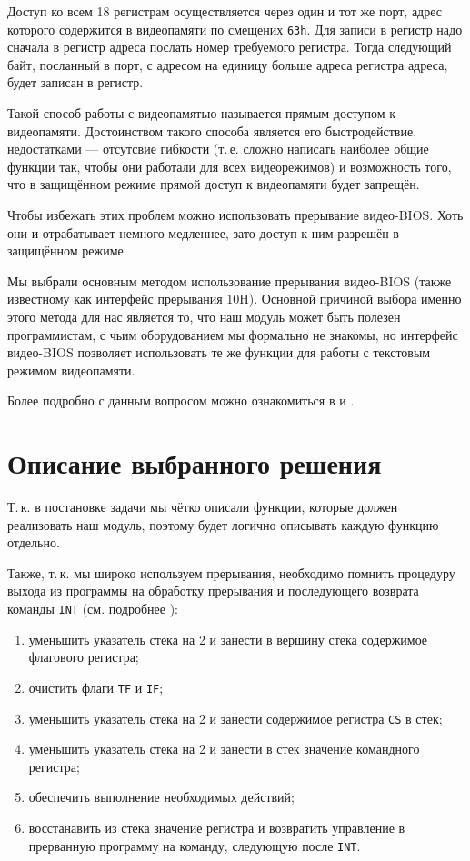 \documentclass[a4paper,12pt,notitlepage,pdftex,headsepline]{scrartcl}
\begin{document}
Доступ ко всем 18 регистрам осуществляется через один и тот же порт, адрес которого содержится в видеопамяти по смещених \texttt{63h}.
Для записи в регистр надо сначала в регистр адреса послать номер требуемого регистра.
Тогда следующий байт, посланный в порт, с адресом на единицу больше адреса регистра адреса, будет записан в регистр.

Такой способ работы с видеопамятью называется прямым доступом к видеопамяти.
Достоинством такого способа является его быстродействие, недостатками --- отсутсвие гибкости (т.\,е. сложно написать наиболее общие функции так, чтобы они работали для всех видеорежимов) и возможность того, что в защищённом режиме прямой доступ к видеопамяти будет запрещён.

Чтобы избежать этих проблем можно использовать прерывание видео-BIOS.
Хоть они и отрабатывает немного медленнее, зато доступ к ним разрешён в защищённом режиме.

Мы выбрали основным методом использование прерывания видео-BIOS (также известному как интерфейс прерывания 10H).
Основной причиной выбора именно этого метода для нас является то, что наш модуль может быть полезен программистам, с чьим оборудованием мы формально не знакомы, но интерфейс видео-BIOS позволяет использовать те же функции для работы с текстовым режимом видеопамяти.

Более подробно с данным вопросом можно ознакомиться в \cite{wilton} и \cite{cyberguru}.
\newpage
\section{Описание выбранного решения}
Т.\,к. в постановке задачи мы чётко описали функции, которые должен реализовать наш модуль, поэтому будет логично описывать каждую функцию отдельно.

Также, т.\,к. мы широко используем прерывания, необходимо помнить процедуру выхода из программы на обработку прерывания и последующего возврата команды \texttt{INT} (см. подробнее \cite{random1}):
\begin{enumerate}
\item уменьшить указатель стека на 2 и занести в вершину стека содержимое флагового регистра;
\item очистить флаги \texttt{TF} и \texttt{IF};
\item уменьшить указатель стека на 2 и занести содержимое регистра \texttt{CS} в стек;
\item уменьшить указатель стека на 2 и занести в стек значение командного регистра;
\item обеспечить выполнение необходимых действий;
\item восстанавить из стека значение регистра и возвратить управление в прерванную программу на команду, следующую после \texttt{INT}.
\end{enumerate}
\end{document}
